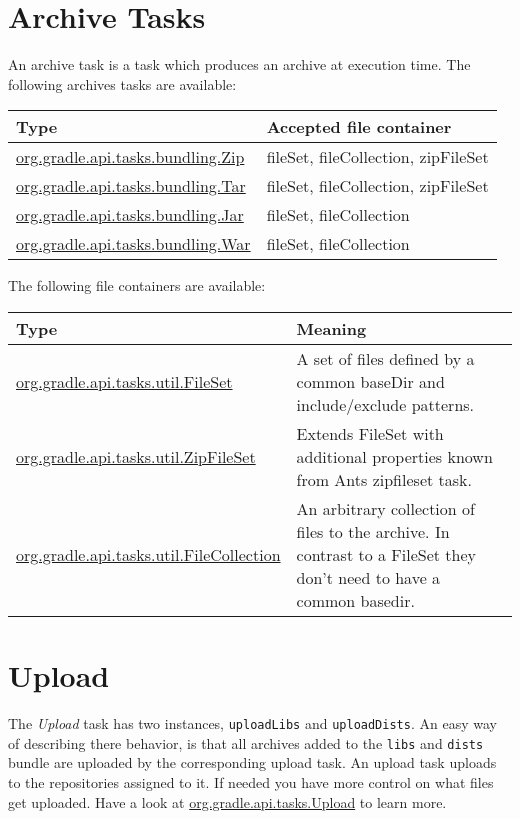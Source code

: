 \section{Archive Tasks} %
\label{sec:archive_tasks}
An archive task is a task which produces an archive at execution time. The following archives tasks are available:
\begin{center}
	\begin{tabular}{|l|l|} \hline
		Type & Accepted file container \\ \hline
		\href{\API tasks/bundling/Zip.html}{org.gradle.api.tasks.bundling.Zip} & fileSet, fileCollection, zipFileSet \\ \hline
		\href{\API tasks/bundling/Tar.html}{org.gradle.api.tasks.bundling.Tar} & fileSet, fileCollection, zipFileSet \\ \hline
		\href{\API tasks/bundling/Jar.html}{org.gradle.api.tasks.bundling.Jar} & fileSet, fileCollection \\ \hline
		\href{\API tasks/bundling/War.html}{org.gradle.api.tasks.bundling.War} & fileSet, fileCollection \\ \hline		
	\end{tabular}
\end{center}
The following file containers are available:
\begin{center}
	\begin{tabularx}{\textwidth}{|l|X|} \hline
		Type & Meaning \\ \hline
		\href{\API tasks/util/FileSet.html}{org.gradle.api.tasks.util.FileSet} & A set of files defined by a common baseDir and include/exclude patterns. \\ \hline
		\href{\API tasks/util/ZipFileSet.html}{org.gradle.api.tasks.util.ZipFileSet} & Extends FileSet with additional properties known from Ants zipfileset task.\\ \hline
		\href{\API tasks/util/FileCollection.html}{org.gradle.api.tasks.util.FileCollection} & An arbitrary collection of files to the archive. In contrast to a FileSet they don't need to have a common basedir.\\ \hline		
	\end{tabularx}
\end{center}

\section{Upload} %
\label{sec:upload}
The \emph{Upload} task has two instances, \texttt{uploadLibs} and \texttt{uploadDists}. An easy way of describing there behavior, is that all archives added to the \texttt{libs} and \texttt{dists} bundle are uploaded by the corresponding upload task. An upload task uploads to the repositories assigned to it. If needed you have more control on what files get uploaded. Have a look at \href{\API tasks/Upload.html}{org.gradle.api.tasks.Upload} to learn more.

